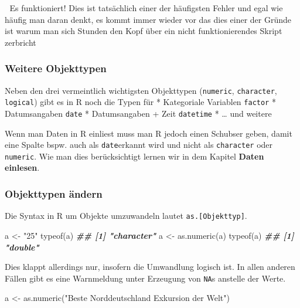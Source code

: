 \documentclass[
]{article}
\newenvironment{Shaded}{\begin{snugshade}}{\end{snugshade}}
\newcommand{\DocumentationTok}[1]{\textcolor[rgb]{0.56,0.35,0.01}{\textbf{\textit{#1}}}}
\newcommand{\FunctionTok}[1]{\textcolor[rgb]{0.00,0.00,0.00}{#1}}
\newcommand{\NormalTok}[1]{#1}
\newcommand{\OtherTok}[1]{\textcolor[rgb]{0.56,0.35,0.01}{#1}}
\newcommand{\StringTok}[1]{\textcolor[rgb]{0.31,0.60,0.02}{#1}}
\begin{document}
💪 Es funktioniert! Dies ist tatsächlich einer der häufigsten Fehler und egal wie häufig man daran denkt, es kommt immer wieder vor das dies einer der Gründe ist warum man sich Stunden den Kopf über ein nicht funktionierendes Skript zerbricht 🤯

\hypertarget{weitere-objekttypen}{%
\subsubsection{Weitere Objekttypen}\label{weitere-objekttypen}}

Neben den drei vermeintlich wichtigsten Objekttypen (\texttt{numeric}, \texttt{character}, \texttt{logical}) gibt es in R noch die Typen für
* Kategoriale Variablen \texttt{factor}
* Datumsangaben \texttt{date}
* Datumsangaben + Zeit \texttt{datetime}
* \ldots{} und weitere

Wenn man Daten in R einliest muss man R jedoch einen Schubser geben, damit eine Spalte bspw. auch als \texttt{date}erkannt wird und nicht als \texttt{character} oder \texttt{numeric}. Wie man dies berücksichtigt lernen wir in dem Kapitel \textbf{Daten einlesen}.

\hypertarget{objekttypen-uxe4ndern}{%
\subsubsection{Objekttypen ändern}\label{objekttypen-uxe4ndern}}

Die Syntax in R um Objekte umzuwandeln lautet \texttt{as.{[}Objekttyp{]}}.

\begin{Shaded}
\begin{Highlighting}[]
\NormalTok{a }\OtherTok{\textless{}{-}} \StringTok{"25"}
\FunctionTok{typeof}\NormalTok{(a)}
\DocumentationTok{\#\# [1] "character"}
\NormalTok{a }\OtherTok{\textless{}{-}} \FunctionTok{as.numeric}\NormalTok{(a)}
\FunctionTok{typeof}\NormalTok{(a)}
\DocumentationTok{\#\# [1] "double"}
\end{Highlighting}
\end{Shaded}

Dies klappt allerdings nur, insofern die Umwandlung logisch ist. In allen anderen Fällen gibt es eine Warnmeldung unter Erzeugung von \texttt{NA}s anstelle der Werte.

\begin{Shaded}
\begin{Highlighting}[]
\NormalTok{a }\OtherTok{\textless{}{-}} \FunctionTok{as.numeric}\NormalTok{(}\StringTok{"Beste Norddeutschland Exkursion der Welt"}\NormalTok{)}
\end{Highlighting}
\end{Shaded}
\end{document}
